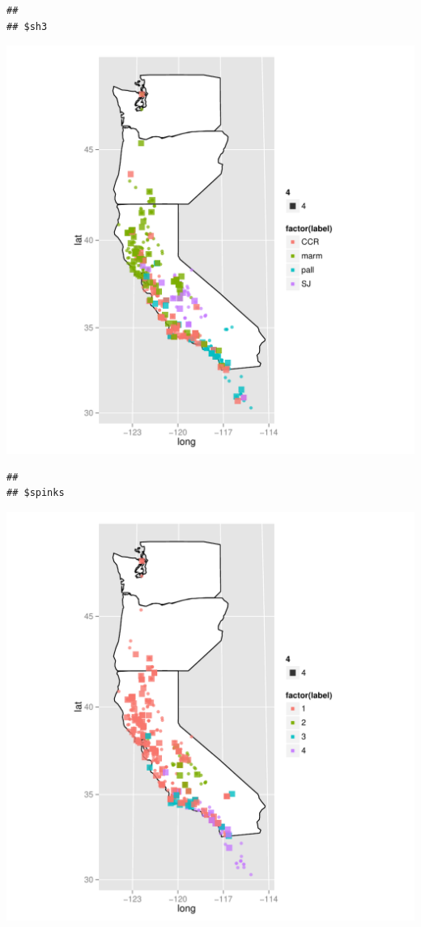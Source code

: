 \documentclass{article}\usepackage{graphicx, color}
\makeatletter
\def\maxwidth{ %
  \ifdim\Gin@nat@width>\linewidth
    \linewidth
  \else
    \Gin@nat@width
  \fi
}
\newenvironment{kframe}{%
 \def\at@end@of@kframe{}%
 \ifinner\ifhmode%
  \def\at@end@of@kframe{\end{minipage}}%
  \begin{minipage}{\columnwidth}%
 \fi\fi%
 \def\FrameCommand##1{\hskip\@totalleftmargin \hskip-\fboxsep
 \colorbox{shadecolor}{##1}\hskip-\fboxsep
     \hskip-\linewidth \hskip-\@totalleftmargin \hskip\columnwidth}%
 \MakeFramed {\advance\hsize-\width
   \@totalleftmargin\z@ \linewidth\hsize
   \@setminipage}}%
 {\par\unskip\endMakeFramed%
 \at@end@of@kframe}
\newenvironment{knitrout}{}{} %
\makeatother
\begin{document}
\begin{knitrout}
\begin{kframe}\begin{verbatim}
## 
## $sh3
\end{verbatim}
\end{kframe}
\includegraphics[width=\maxwidth]{figure/multi-map3} 
\begin{kframe}\begin{verbatim}
## 
## $spinks
\end{verbatim}
\end{kframe}
\includegraphics[width=\maxwidth]{figure/multi-map4} 


\end{knitrout}
\end{document}

